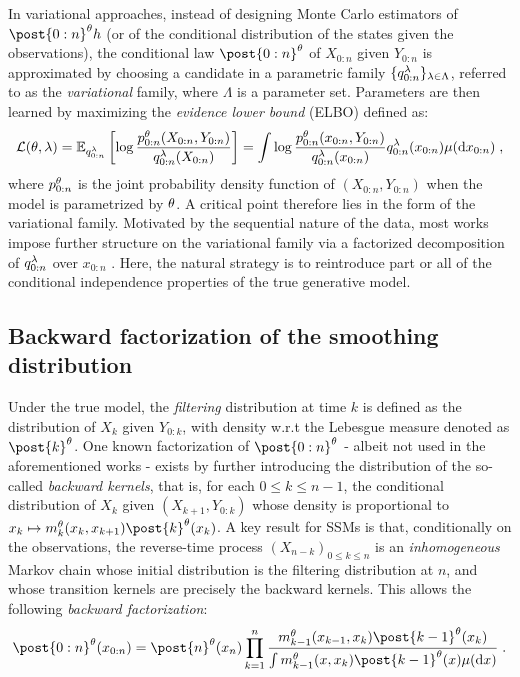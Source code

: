 \documentclass{article}
\begin{document}
In variational approaches, instead of designing Monte Carlo estimators of $\post{0:n}^{\parvec} h$ (or of the conditional distribution of the states given the observations), the conditional law $\post{0:n}^{\parvec}$ of $X_{0:n}$ given $Y_{0:n}$ is approximated by choosing a candidate in a parametric family $\{ q_{0:n}^{\lambda}\}_{\lambda \in \Lambda}$, referred to as the \textit{variational} family, where $\Lambda$ is a parameter set. 
Parameters are then learned by maximizing the \textit{evidence lower bound} (ELBO) defined as:
\begin{equation}
\label{eq:ELBO}
\mathcal{L}(\theta,\lambda) = \mathbb{E}_{ q_{0:n}^{\lambda}}\left[\log \frac{p^{\theta}_{0:n}(X_{0:n},Y_{0:n})}{ q_{0:n}^{\lambda}(X_{0:n})}\right] = \int \log \frac{p^{\theta}_{0:n}(x_{0:n},Y_{0:n})}{ q_{0:n}^{\lambda}(x_{0:n})} q_{0:n}^{\lambda}(x_{0:n})\mu(\mathrm{d} x_{0:n})\;,
\end{equation}
where $p^{\theta}_{0:n}$ is the joint probability density function of $(X_{0:n},Y_{0:n})$ when the model is parametrized by $\theta$. A critical point therefore lies in the form of the variational family. Motivated by the sequential nature of the data, most works impose further structure on the variational family via a factorized decomposition of $q_{0:n}^{\lambda}$ over $x_{0:n}$ \cite{johnson2016, krishnan2017structured, Lin2018VariationalMP, Marino2018AGM}. Here, the natural strategy is to reintroduce part or all of the conditional independence properties of the true generative model.

\subsection{Backward factorization of the smoothing distribution}
\label{sec:backward_fact}
Under the true model, the \textit{filtering} distribution at time $k$ is defined as the distribution of $X_k$ given $Y_{0:k}$, with density w.r.t the Lebesgue measure denoted as $\post{k}^{\parvec}$. 
One known factorization of $\post{0:n}^{\parvec}$ - albeit not used in the aforementioned works - exists by further introducing the distribution of the so-called \textit{backward kernels}, that is, for each $0\leqslant k \leqslant n - 1$, the conditional distribution of $X_k$ given $(X_{k+1}, Y_{0:k})$ whose density is proportional to $x_k \mapsto \hd{k}{\parvec}(x_{k},x_{k+1})\post{k}^{\parvec}(x_{k})$. 
A key result for SSMs is that, conditionally on the observations, the reverse-time process $(X_{n-k})_{0\leqslant k\leqslant n}$ is an \textit{inhomogeneous} Markov chain whose initial distribution is the filtering distribution at $n$, and whose transition kernels are precisely the backward kernels. 
This allows the following \textit{backward factorization}:
\begin{equation*}
    \post{0:n}^{\parvec}(x_{0:n}) = \post{n}^{\parvec}(x_n)\prod_{k=1}^{n}\frac{\hd{k - 1}{\parvec}(x_{k - 1},x_{k})\post{k - 1}^{\parvec}(x_{k})}{\int \hd{k - 1}{\parvec}(x,x_{k})\post{k - 1}^{\parvec}(x) \mu(\rmd x)}\eqsp. 
\end{equation*}
\end{document}
